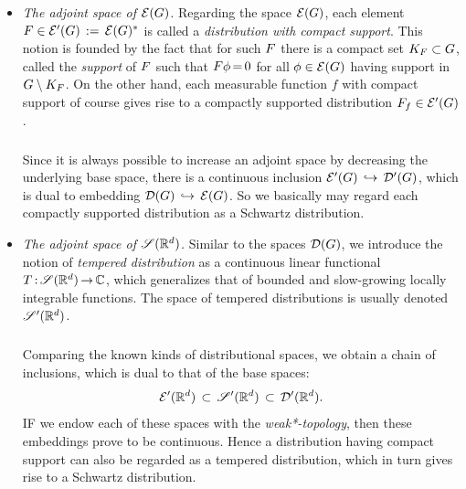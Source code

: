 \documentclass[11pt,twoside]{article}
\begin{document}
\begin{itemize}[leftmargin=15pt,itemsep=6pt]
\item[6.] \textit{The adjoint space of ${\mathcal{E}}(G)$.}
Regarding the {\FRECHET} space ${\mathcal{E}}(G)$,
each element $F \in {\mathcal{E}}'(G) \,:=\, {\mathcal{E}}(G)^*$ is called
a \textit{distribution with compact support}.
This notion is founded by the fact
that for such $F$ there is a compact set $K_{F} \subset G$,
called the \textit{support} of $F$
such that
$F \phi {\,=\,} 0$ for all $\phi \in {\mathcal{E}}(G)$
having support in $G \setminus K_{F}$.
On the other hand,
each measurable function $f$ with compact support of course
gives rise to a compactly supported distribution $F_f \in {\mathcal{E}}'(G)$.

\subparagraph*{}
Since it is always possible to increase an adjoint space
by decreasing the underlying base space,
there is a continuous inclusion ${\mathcal{E}}'(G) \, \hookrightarrow \, {\mathcal{D}}'(G)$,
which is dual to embedding
${\mathcal{D}}(G) \, \hookrightarrow \, {\mathcal{E}}(G)$.
So we basically may regard
each compactly supported distribution as a Schwartz distribution.

\item[7.] \textit{The adjoint space of $\mathscr{S}({\mathbb{R}}^d)$.}
Similar to the spaces ${\mathcal{D}}(G)$,
we introduce the notion of \textit{tempered distribution}
as a continuous linear functional $T{\,:\,}\mathscr{S}({\mathbb{R}}^d) {\,\to\,} {\mathbb{C}}$,
which generalizes that of bounded and slow-growing locally integrable functions.
The space of tempered distributions is usually denoted $\mathscr{S}'({\mathbb{R}}^d)$.

\subparagraph*{} %
Comparing the known kinds of distributional spaces,
we obtain a chain of inclusions,
which is dual to that of the base spaces:
\[
{\mathcal{E}}'({\mathbb{R}}^d) \, \subset \, \mathscr{S}'({\mathbb{R}}^d) \, \subset \, {\mathcal{D}}'({\mathbb{R}}^d).
\]
IF we endow each of these spaces with the \textit{weak*-topology},
then these embeddings prove to be continuous.
Hence a distribution having compact support can also be regarded
as a tempered distribution,
which in turn gives rise to a Schwartz distribution.


\end{itemize}
\end{document}

